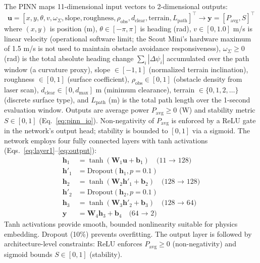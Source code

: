 \documentclass[pdflatex,sn-nature]{sn-jnl}%
\begin{document}
The PINN maps 11-dimensional input vectors to 2-dimensional outputs:
\begin{equation}
\mathbf{u} = [x, y, \theta, v, \omega_{\Sigma}, \text{slope}, \text{roughness}, \rho_{\text{obs}}, d_{\text{clear}}, \text{terrain}, L_{\text{path}}]^\top \rightarrow \mathbf{y} = [P_{\text{avg}}, S]^\top
\label{eq:pinn_io}
\end{equation}
where $(x, y)$ is position (m), $\theta \in [-\pi, \pi]$ is heading (rad), $v \in [0, 1.0]$ m/s is linear velocity (operational software limit; the Scout Mini's hardware maximum of 1.5 m/s is not used to maintain obstacle avoidance responsiveness), $\omega_{\Sigma} \geq 0$ (rad) is the total absolute heading change $\sum_i |\Delta\psi_i|$ accumulated over the path window (a curvature proxy), slope $\in [-1, 1]$ (normalized terrain inclination), roughness $\in [0, 1]$ (surface coefficient), $\rho_{\text{obs}} \in [0, 1]$ (obstacle density from laser scan), $d_{\text{clear}} \in [0, d_{\max}]$ m (minimum clearance), terrain $\in \{0, 1, 2, \ldots\}$ (discrete surface type), and $L_{\text{path}}$ (m) is the total path length over the 1-second evaluation window. Outputs are average power $P_{\text{avg}} \geq 0$ (W) and stability metric $S \in [0, 1]$ (Eq.~\ref{eq:pinn_io}). Non-negativity of $P_{\text{avg}}$ is enforced by a ReLU gate in the network's output head; stability is bounded to $[0,1]$ via a sigmoid. The network employs four fully connected layers with tanh activations (Eqs.~\ref{eq:layer1}--\ref{eq:output}):
\begin{align}
\mathbf{h}_1 &= \tanh(\mathbf{W}_1 \mathbf{u} + \mathbf{b}_1) \quad \text{(11 → 128)} \label{eq:layer1} \\
\mathbf{h}'_1 &= \text{Dropout}(\mathbf{h}_1, p=0.1) \label{eq:dropout1} \\
\mathbf{h}_2 &= \tanh(\mathbf{W}_2 \mathbf{h}'_1 + \mathbf{b}_2) \quad \text{(128 → 128)} \label{eq:layer2} \\
\mathbf{h}'_2 &= \text{Dropout}(\mathbf{h}_2, p=0.1) \label{eq:dropout2} \\
\mathbf{h}_3 &= \tanh(\mathbf{W}_3 \mathbf{h}'_2 + \mathbf{b}_3) \quad \text{(128 → 64)} \label{eq:layer3} \\
\mathbf{y} &= \mathbf{W}_4 \mathbf{h}_3 + \mathbf{b}_4 \quad \text{(64 → 2)} \label{eq:output}
\end{align}
Tanh activations provide smooth, bounded nonlinearity suitable for physics embedding. Dropout (10\%) prevents overfitting. The output layer is followed by architecture-level constraints: ReLU enforces $P_{\text{avg}} \geq 0$ (non-negativity) and sigmoid bounds $S \in [0,1]$ (stability).
\end{document}
